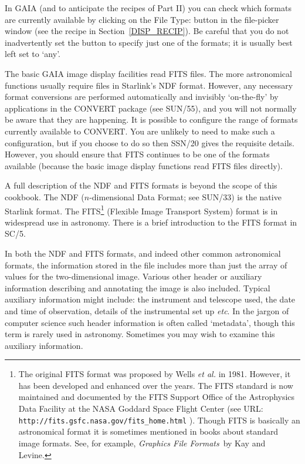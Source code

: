\documentclass[twoside,11pt]{article}
\newcommand{\htmladdnormallink}[2]{#1}
\newcommand{\xref}[3]{#1}
\begin{document}
In GAIA (and to anticipate the recipes of Part II) you can check which
formats are currently available by clicking on the {\sf File Type:} button
in the file-picker window (see the recipe in Section~\ref{DISP_RECIP}).
Be careful that you do not inadvertently set the button to specify just one
of the formats; it is usually best left set to `{\sf any}'.

The basic GAIA image display facilities read FITS files.  The more
astronomical functions usually require files in Starlink's NDF format.
However, any necessary format conversions are performed automatically and
invisibly `on-the-fly' by applications in the CONVERT package (see
\xref{SUN/55}{sun55}{}\cite{SUN55}), and you will not normally be aware
that they are happening.  It is possible to configure the range of formats
currently available to CONVERT.  You are unlikely to need to make such a
configuration, but if you choose to do so then
\xref{SSN/20}{ssn20}{}\cite{SSN20} gives the requisite details.  However,
you should ensure that FITS continues to be one of the formats available
(because the basic image display functions read FITS files directly).

A full description of the NDF and FITS formats is beyond the scope of this
cookbook.  The NDF ($n$-dimensional Data Format; see
\xref{SUN/33}{sun33}{}\cite{SUN33}) is the native Starlink format.
The FITS\footnote{The original FITS format was proposed by Wells {\it et
al.}\/\cite{WELLS81} in 1981.  However, it has been developed and enhanced
over the years.  The FITS standard is now maintained and documented by the
FITS Support Office of the Astrophysics Data Facility at the NASA Goddard
Space Flight Center (see URL: 
\htmladdnormallink{ {\tt http://fits.gsfc.nasa.gov/fits\_home.html} }
{http://fits.gsfc.nasa.gov/fits_home.html}).
Though FITS is basically an astronomical format it is sometimes mentioned
in books about standard image formats.  See, for example, {\it Graphics
File Formats}\, by Kay and Levine\cite{KAY95}.} (Flexible Image Transport
System) format is in widespread use in astronomy.  There is a brief
\xref{introduction to the FITS format}{sc5}{FITS} in
\xref{SC/5}{sc5}{}\cite{SC5}.

In both the NDF and FITS formats, and indeed other common astronomical
formats, the information stored in the file includes more than just the
array of values for the two-dimensional image.  Various other header or
auxiliary information describing and annotating the image is also included.
Typical auxiliary information might include: the instrument and telescope
used, the date and time of observation, details of the instrumental set up
\emph{etc}.  In the jargon of computer science such header information is
often called `metadata', though this term is rarely used in astronomy.
Sometimes you may wish to examine this auxiliary information.
\end{document}
